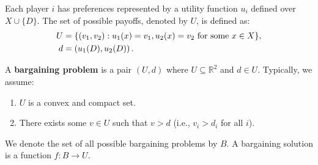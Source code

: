 \documentclass[11pt]{elegantbook_2}
\begin{document}
Each player $i$ has preferences represented by a utility function $u_i$ defined over $X\cup\{D\}$. The set of possible payoffs, denoted by $U$, is defined as:
\begin{equation}
    \begin{aligned}
        U&=\{(v_1,v_2):u_1(x)=v_1, u_2(x)=v_2 \textnormal{ for some } x\in X\},\\
        d&=\left(u_1(D), u_2(D)\right).
    \end{aligned}
    \nonumber
\end{equation}
\begin{definition}
    A \textbf{bargaining problem} is a pair $(U,d)$ where $U\subseteq \mathbb{R}^2$ and $d\in U$. Typically, we assume:
    \begin{enumerate}
        \item $U$ is a convex and compact set.
        \item There exists some $v\in U$ such that $v>d$ (i.e., $v_i>d_i$ for all $i$).
    \end{enumerate}
\end{definition}
We denote the set of all possible bargaining problems by $B$. A bargaining solution is a function $f:B \rightarrow U$.
\end{document}
